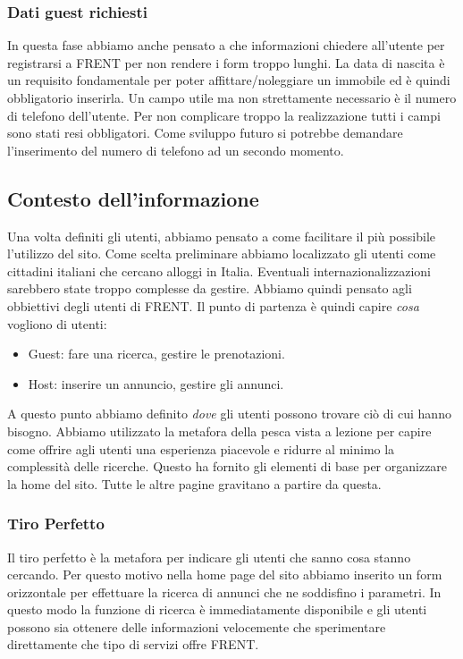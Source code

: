 \documentclass[1_relazione.tex]{subfiles}
\begin{document}
    \subsubsection{Dati guest richiesti}
    In questa fase abbiamo anche pensato a che informazioni chiedere all'utente per registrarsi a FRENT per non rendere i form troppo lunghi. La data di nascita è un requisito fondamentale per poter affittare/noleggiare un immobile ed è quindi obbligatorio inserirla. Un campo utile ma non strettamente necessario è il numero di telefono dell'utente. Per non complicare troppo la realizzazione tutti i campi sono stati resi obbligatori. Come sviluppo futuro si potrebbe demandare l'inserimento del numero di telefono ad un secondo momento.

    \subsection{Contesto dell'informazione }
    Una volta definiti gli utenti, abbiamo pensato a come facilitare il pi\`{u} possibile l'utilizzo del sito. Come scelta preliminare abbiamo localizzato gli utenti come cittadini italiani che cercano alloggi in Italia. Eventuali internazionalizzazioni sarebbero state troppo complesse da gestire. Abbiamo quindi pensato agli obbiettivi degli utenti di FRENT. Il punto di partenza \`{e} quindi capire \textit{cosa} vogliono di utenti:

    \begin{itemize}
        \item Guest: fare una ricerca, gestire le prenotazioni.
        \item Host: inserire un annuncio, gestire gli annunci.
    \end{itemize}

    A questo punto abbiamo definito \textit{dove} gli utenti possono trovare ciò di cui hanno bisogno. Abbiamo utilizzato la metafora della pesca vista a lezione per capire come offrire agli utenti una esperienza piacevole e ridurre al minimo la complessità delle ricerche. Questo ha fornito gli elementi di base per organizzare la home del sito. Tutte le altre pagine gravitano a partire da questa.

\subsubsection{Tiro Perfetto} 
Il tiro perfetto è la metafora per indicare gli utenti che sanno cosa stanno cercando. Per questo motivo nella home page del sito abbiamo inserito un form orizzontale per effettuare la ricerca di annunci che ne soddisfino i parametri. In questo modo la funzione di ricerca è immediatamente disponibile e gli utenti possono sia ottenere delle informazioni velocemente che sperimentare direttamente che tipo di servizi offre FRENT.
 
\end{document}
